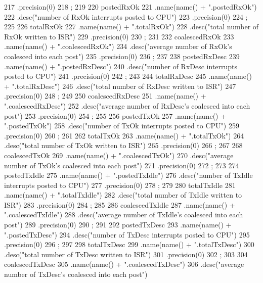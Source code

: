 \begin{DoxyCode}
{217         .precision(0)
218         ;
219 
220     postedRxOk
221         .name(name() + ".postedRxOk")
222         .desc("number of RxOk interrupts posted to CPU")
223         .precision(0)
224         ;
225 
226     totalRxOk
227         .name(name() + ".totalRxOk")
228         .desc("total number of RxOk written to ISR")
229         .precision(0)
230         ;
231 
232     coalescedRxOk
233         .name(name() + ".coalescedRxOk")
234         .desc("average number of RxOk's coalesced into each post")
235         .precision(0)
236         ;
237 
238     postedRxDesc
239         .name(name() + ".postedRxDesc")
240         .desc("number of RxDesc interrupts posted to CPU")
241         .precision(0)
242         ;
243 
244     totalRxDesc
245         .name(name() + ".totalRxDesc")
246         .desc("total number of RxDesc written to ISR")
247         .precision(0)
248         ;
249 
250     coalescedRxDesc
251         .name(name() + ".coalescedRxDesc")
252         .desc("average number of RxDesc's coalesced into each post")
253         .precision(0)
254         ;
255 
256     postedTxOk
257         .name(name() + ".postedTxOk")
258         .desc("number of TxOk interrupts posted to CPU")
259         .precision(0)
260         ;
261 
262     totalTxOk
263         .name(name() + ".totalTxOk")
264         .desc("total number of TxOk written to ISR")
265         .precision(0)
266         ;
267 
268     coalescedTxOk
269         .name(name() + ".coalescedTxOk")
270         .desc("average number of TxOk's coalesced into each post")
271         .precision(0)
272         ;
273 
274     postedTxIdle
275         .name(name() + ".postedTxIdle")
276         .desc("number of TxIdle interrupts posted to CPU")
277         .precision(0)
278         ;
279 
280     totalTxIdle
281         .name(name() + ".totalTxIdle")
282         .desc("total number of TxIdle written to ISR")
283         .precision(0)
284         ;
285 
286     coalescedTxIdle
287         .name(name() + ".coalescedTxIdle")
288         .desc("average number of TxIdle's coalesced into each post")
289         .precision(0)
290         ;
291 
292     postedTxDesc
293         .name(name() + ".postedTxDesc")
294         .desc("number of TxDesc interrupts posted to CPU")
295         .precision(0)
296         ;
297 
298     totalTxDesc
299         .name(name() + ".totalTxDesc")
300         .desc("total number of TxDesc written to ISR")
301         .precision(0)
302         ;
303 
304     coalescedTxDesc
305         .name(name() + ".coalescedTxDesc")
306         .desc("average number of TxDesc's coalesced into each post")
}
\end{DoxyCode}
